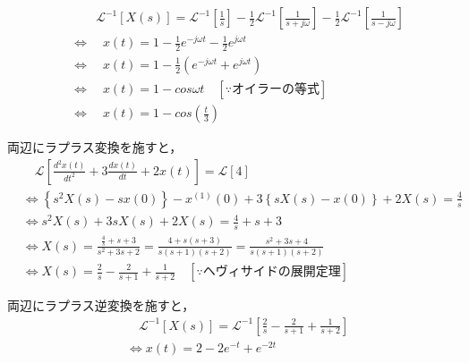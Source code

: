 \documentclass[a4paper,12pt]{article}
\begin{document}
\begin{tcolorbox}[title={[12] 次の微分方程式をラプラス変換を用いて解け.
  \[
      9 \frac{d^2 x(t)}{dt^2} + x(t) = 1 
  \]
  \quad ただし，初期値は，$x(0) = 0,\ x'(0) = 0$ とする．
  }]
\begin{align*}
    &\qquad  \mathcal{L}^{-1} \left[ X(s) \right]
    = \mathcal{L}^{-1} \left[ \frac{1}{s} \right] 
    - \frac{1}{2} \mathcal{L}^{-1} \left[\frac{1}{s + j \omega} \right]
    - \frac{1}{2} \mathcal{L}^{-1} \left[\frac{1}{s - j \omega} \right] \\
    &\Leftrightarrow \quad x(t) 
    = 1 - \frac{1}{2} e^{-j \omega t} - \frac{1}{2} e^{j \omega t} \\
    &\Leftrightarrow \quad x(t) 
    = 1 - \frac{1}{2} \left( e^{-j \omega t} + e^{j \omega t} \right) \\
    &\Leftrightarrow \quad x(t) 
    = 1 - cos{\omega t} \quad \left[ \because オイラーの等式 \right]\\
    &\Leftrightarrow \quad x(t) 
    = 1 - cos \left(\frac{t}{3}\right)
\end{align*}



\vspace{2mm}
  \end{tcolorbox}
\begin{tcolorbox}[title={[13] つぎの微分方程式をラプラス変換を用いて解け．
  \[
  \frac{d^2 x(t)}{dt^2} + 3 \frac{dx(t)}{dt} + 2x(t) = 4
  \]
  \quad ただし，初期条件は，$x(0)=1,\ x^{(1)}(0)=0$ とする． }]

  \quad 両辺にラプラス変換を施すと，
\vspace{-3mm}
\begin{align*}
&\quad \mathcal{L} \left[ \frac{d^2 x(t)}{dt^2} + 3 \frac{dx(t)}{dt} + 2x(t) \right]
= \mathcal{L} \left[ 4 \right] \\
&\Leftrightarrow \left\{s^2 X(s) - sx(0)\right\} - x^{(1)}(0) + 3\left\{sX(s) - x(0) \right\} + 2X(s) = \frac{4}{s} \\
&\Leftrightarrow s^2 X(s) + 3sX(s) + 2X(s) = \frac{4}{s} + s + 3 \\
&\Leftrightarrow X(s) = \frac{\frac{4}{s} + s + 3}{s^2 + 3s + 2} = \frac{4 + s(s + 3)}{s(s + 1)(s + 2)} = \frac{s^2 + 3s + 4}{s(s + 1)(s + 2)} \\
&\Leftrightarrow X(s) = \frac{2}{s} - \frac{2}{s+1} + \frac{1}{s+2} \quad \left[ \because ヘヴィサイドの展開定理 \right]
\end{align*}

\quad 両辺にラプラス逆変換を施すと，
\vspace{-3mm}
\begin{align*}
&\quad \mathcal{L}^{-1} \left[ X(s) \right] 
= \mathcal{L}^{-1} \left[ \frac{2}{s} - \frac{2}{s+1} + \frac{1}{s+2} \right] \\
&\Leftrightarrow x(t) = 2 - 2e^{-t} + e^{-2t}
\end{align*}



\vspace{2mm}
  \end{tcolorbox}
\end{document}
